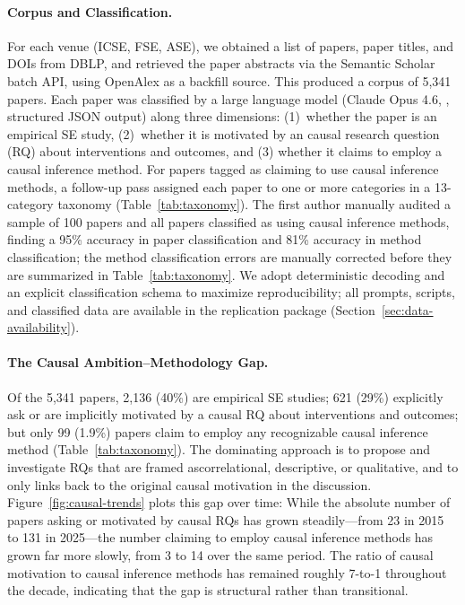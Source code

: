\paragraph{Corpus and Classification.}
For each venue (ICSE, FSE, ASE), we obtained a list of papers, paper titles, and DOIs from DBLP, and retrieved the paper abstracts via the Semantic Scholar batch API, using OpenAlex as a backfill source.
This produced a corpus of 5,341 papers.
Each paper was classified by a large language model (Claude Opus 4.6, , structured JSON output) along three dimensions: (1)~whether the paper is an empirical SE study, %
(2)~whether it is motivated by an causal research question (RQ) about interventions and outcomes, and (3) whether it claims to employ a causal inference method.
For papers tagged as claiming to use causal inference methods, a follow-up pass assigned each paper to one or more categories in a 13-category taxonomy (Table~\ref{tab:taxonomy}).
The first author manually audited a sample of 100 papers and all papers classified as using causal inference methods, finding a 95\% accuracy in paper classification and 81\% accuracy in method classification; the method classification errors are manually corrected before they are summarized in Table~\ref{tab:taxonomy}.
We adopt deterministic decoding and an explicit classification schema to maximize reproducibility; all prompts, scripts, and classified data are available in the replication package (Section~\ref{sec:data-availability}).

\paragraph{The Causal Ambition--Methodology Gap.}
Of the 5,341 papers, 2,136 (40\%) are empirical SE studies; 621 (29\%) explicitly ask or are implicitly motivated by a causal RQ about interventions and outcomes; but only 99 (1.9\%) papers claim to employ any recognizable causal inference method (Table~\ref{tab:taxonomy}).
The dominating approach is to propose and investigate RQs that are framed ascorrelational, descriptive, or qualitative, and to only links back to the original causal motivation in the discussion.
Figure~\ref{fig:causal-trends} plots this gap over time: While the absolute number of papers asking or motivated by causal RQs has grown steadily---from 23 in 2015 to 131 in 2025---the number claiming to employ causal inference methods has grown far more slowly, from 3 to 14 over the same period.
The ratio of causal motivation to causal inference methods has remained roughly 7-to-1 throughout the decade, indicating that the gap is structural rather than transitional.

